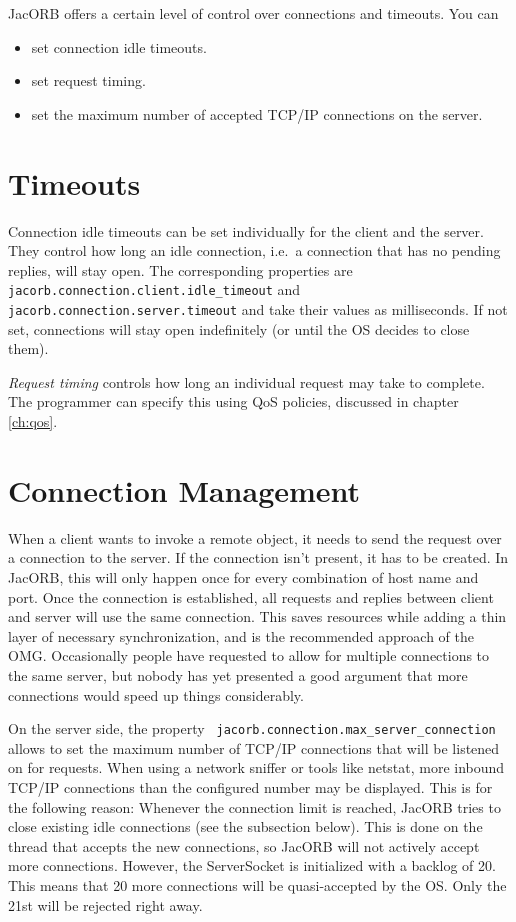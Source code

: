 
JacORB offers a certain level of control over connections and timeouts. You
can
\begin{itemize}
\item set connection idle timeouts.
\item set request timing.
\item set the maximum number of accepted TCP/IP connections on the server.
\end{itemize}

\section{Timeouts}
\label{connection_timeouts}
Connection idle timeouts can be set individually for the client and the
server. They control how long an idle connection, i.e.~a connection that has
no pending replies, will stay open. The corresponding properties are {\tt
  jacorb.connection.client.idle\_timeout} and {\tt
  jacorb.connection.server.timeout} and take their values as milliseconds. If
not set, connections will stay open indefinitely (or until the OS decides to
close them).

\emph{Request timing} controls how long an individual request may take to
complete.  The programmer can specify this using QoS policies,
discussed in chapter \ref{ch:qos}.

\section{Connection Management}
\label{connection_management}

When a client wants to invoke a remote object, it needs to send the request
over a connection to the server. If the connection isn't present, it has to be
created. In JacORB, this will only happen once for every combination of host
name and port. Once the connection is established, all requests and replies
between client and server will use the same connection. This saves resources
while adding a thin layer of necessary synchronization, and is the recommended
approach of the OMG. Occasionally people have requested to allow for multiple
connections to the same server, but nobody has yet presented a good argument
that more connections would speed up things considerably.

On the server side, the property {\tt
  jacorb.connection.max\_server\_connection} allows to set the maximum number
of TCP/IP connections that will be listened on for requests. When using a
network sniffer or tools like netstat, more inbound TCP/IP connections than
the configured number may be displayed. This is for the following reason:
Whenever the connection limit is reached, JacORB tries to close existing idle
connections (see the subsection below). This is done on the thread
that accepts the new connections, so JacORB will not actively accept more
connections. However, the ServerSocket is initialized with a backlog of 20.
This means that 20 more connections will be quasi-accepted by the OS. Only the
21st will be rejected right away.

